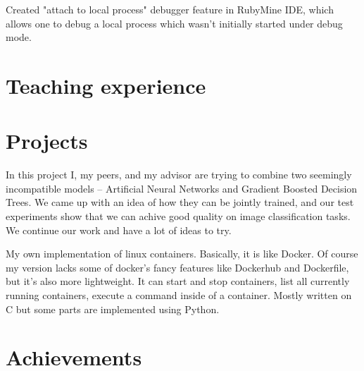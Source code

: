 \documentclass[10pt,a4paper,sans]{moderncv} %
\begin{document}
{Created "attach to local process" debugger feature in RubyMine IDE, which allows one to
debug a local process which wasn't initially started under debug mode.}

\section{Teaching experience}


\section{Projects}

{In this project I, my peers, and my advisor are trying to combine two seemingly incompatible models -- Artificial Neural Networks and Gradient Boosted Decision Trees. We came up with an idea of how they can be jointly trained, and our test experiments show that we can achive good quality on image classification tasks. We continue our work and have a lot of ideas to try.}

{My own implementation of linux containers. Basically, it is like Docker. Of course my version lacks some of docker's fancy features like Dockerhub and Dockerfile, but it's also more lightweight.
It can start and stop containers, list all currently running containers, execute a command inside of a container. 
Mostly written on C but some parts are implemented using Python.}


\section{Achievements}

\end{document}
